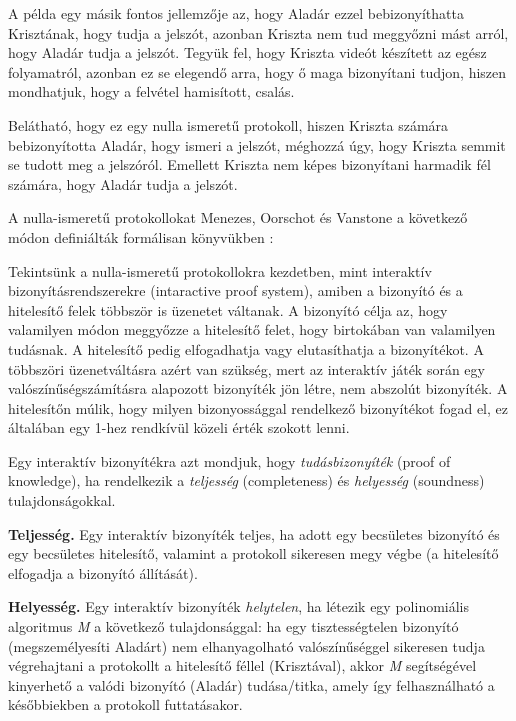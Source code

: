 A példa egy másik fontos jellemzője az, hogy Aladár ezzel bebizonyíthatta Krisztának, hogy tudja a jelszót, azonban Kriszta nem tud meggyőzni mást arról, hogy Aladár tudja a jelszót. Tegyük fel, hogy Kriszta videót készített az egész folyamatról, azonban ez se elegendő arra, hogy ő maga bizonyítani tudjon, hiszen mondhatjuk, hogy a felvétel hamisított, csalás.

Belátható, hogy ez egy nulla ismeretű protokoll, hiszen Kriszta számára bebizonyította Aladár, hogy ismeri a jelszót, méghozzá úgy, hogy Kriszta semmit se tudott meg a jelszóról. Emellett Kriszta nem képes bizonyítani harmadik fél számára, hogy Aladár tudja a jelszót.

A nulla-ismeretű protokollokat Menezes, Oorschot és Vanstone a következő módon definiálták formálisan könyvükben \citeyear{menezes1997handbook}:

Tekintsünk a nulla-ismeretű protokollokra kezdetben, mint interaktív bizonyításrendszerekre (intaractive proof system), amiben a bizonyító és a hitelesítő felek többször is üzenetet váltanak. A bizonyító célja az, hogy valamilyen módon meggyőzze a hitelesítő felet, hogy birtokában van valamilyen tudásnak. A hitelesítő pedig elfogadhatja vagy elutasíthatja a bizonyítékot. A többszöri üzenetváltásra azért van szükség, mert az interaktív játék során egy valószínűségszámításra alapozott bizonyíték jön létre, nem abszolút bizonyíték. A hitelesítőn múlik, hogy milyen bizonyossággal rendelkező bizonyítékot fogad el, ez általában egy 1-hez rendkívül közeli érték szokott lenni.

Egy interaktív bizonyítékra azt mondjuk, hogy \textit{tudásbizonyíték} (proof of knowledge), ha rendelkezik a \textit{teljesség} (completeness) és \textit{helyesség} (soundness) tulajdonságokkal.

\begin{definition}
    \textbf{Teljesség.} Egy interaktív bizonyíték teljes, ha adott egy becsületes bizonyító és egy becsületes hitelesítő, valamint a protokoll sikeresen megy végbe (a hitelesítő elfogadja a bizonyító állítását).
\end{definition}

\begin{definition}
    \textbf{Helyesség.} Egy interaktív bizonyíték \textit{helytelen}, ha létezik egy polinomiális algoritmus \textit{M} a következő tulajdonsággal: ha egy tisztességtelen bizonyító (megszemélyesíti Aladárt) nem elhanyagolható valószínűséggel sikeresen tudja végrehajtani a protokollt a hitelesítő féllel (Krisztával), akkor \textit{M} segítségével kinyerhető a valódi bizonyító (Aladár) tudása/titka, amely így felhasználható a későbbiekben a protokoll futtatásakor.
\end{definition}


